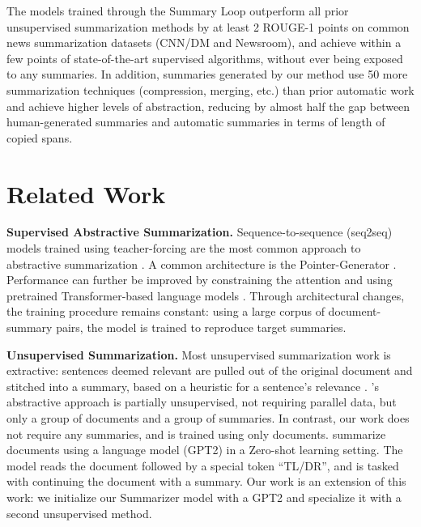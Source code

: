 \documentclass[11pt,a4paper]{article}
\begin{document}
The models trained through the Summary Loop outperform all prior unsupervised summarization methods by at least 2 ROUGE-1 points on common news summarization datasets (CNN/DM and Newsroom), and achieve within a few points of state-of-the-art supervised algorithms, without ever being exposed to any summaries.
In addition, summaries generated by our method use 50 more summarization techniques (compression, merging, etc.) than prior automatic work and achieve higher levels of abstraction, reducing by almost half the gap between human-generated summaries and automatic summaries in terms of length of copied spans.

 
\section{Related Work}

\textbf{Supervised Abstractive Summarization.} Sequence-to-sequence (seq2seq) \cite{sutskever2014sequence} models trained using teacher-forcing are the most common approach to abstractive summarization \cite{nallapati2016abstractive}. A common architecture is the Pointer-Generator \cite{see2017get}. Performance can further be improved by constraining the attention \cite{gehrmann2018bottom,gui2019attention,wang2019concept} and using pretrained Transformer-based language models \cite{lewis2019bart,chi2019cross,edunov2019pre}. Through architectural changes, the training procedure remains constant: using a large corpus of document-summary pairs, the model is trained to reproduce target summaries.

\textbf{Unsupervised Summarization.} Most unsupervised summarization work is extractive: sentences deemed relevant are pulled out of the original document and stitched into a summary, based on a heuristic for a sentence's relevance \cite{mihalcea2004textrank,barrios2015variations,west2019bottlesum}. \citet{nikolov2019abstractive}'s abstractive approach is partially unsupervised, not requiring parallel data, but only a group of documents and a group of summaries. In contrast, our work does not require any summaries, and is trained using only documents.
\citet{radford2019language} summarize documents using a language model (GPT2) in a Zero-shot learning setting. The model reads the document followed by a special token ``TL/DR'', and is tasked with continuing the document with a summary. Our work is an  extension of this work: we initialize our Summarizer model with a GPT2 and specialize it with a second unsupervised method.
\end{document}
